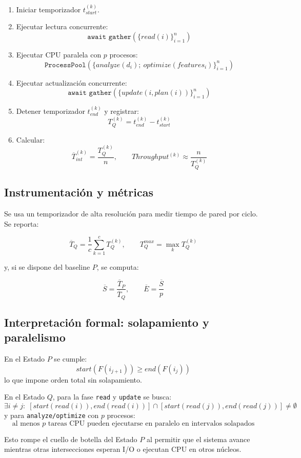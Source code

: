 \documentclass[12pt]{article}
\begin{document}
\begin{enumerate}
\item Iniciar temporizador \(t_{start}^{(k)}\).
\item Ejecutar lectura concurrente:
\[
\texttt{await gather}(\{read(i)\}_{i=1}^{n})
\]
\item Ejecutar CPU paralela con \(p\) procesos:
\[
\texttt{ProcessPool}(\{analyze(d_i);\ optimize(features_i)\}_{i=1}^{n})
\]
\item Ejecutar actualización concurrente:
\[
\texttt{await gather}(\{update(i,plan(i))\}_{i=1}^{n})
\]
\item Detener temporizador \(t_{end}^{(k)}\) y registrar:
\[
T_Q^{(k)} = t_{end}^{(k)} - t_{start}^{(k)}
\]
\item Calcular:
\[
\overline{T}_{int}^{(k)} = \frac{T_Q^{(k)}}{n},
\qquad
Throughput^{(k)} \approx \frac{n}{T_Q^{(k)}}
\]
\end{enumerate}

\subsection{Instrumentación y métricas}

Se usa un temporizador de alta resolución para medir tiempo de pared por ciclo. Se reporta:

\[
\overline{T}_Q = \frac{1}{c}\sum_{k=1}^{c} T_Q^{(k)},
\qquad
T_Q^{max} = \max_k T_Q^{(k)}
\]

y, si se dispone del baseline \(P\), se computa:

\[
\overline{S} = \frac{\overline{T}_P}{\overline{T}_Q},
\qquad
\overline{E} = \frac{\overline{S}}{p}
\]

\subsection{Interpretación formal: solapamiento y paralelismo}

En el Estado \(P\) se cumple:
\[
start(F(i_{j+1})) \ge end(F(i_j))
\]
lo que impone orden total sin solapamiento.

En el Estado \(Q\), para la fase \texttt{read} y \texttt{update} se busca:
\[
\exists i\neq j:\; [start(read(i)),end(read(i))]\cap[start(read(j)),end(read(j))]\neq \emptyset
\]
y para \texttt{analyze/optimize} con \(p\) procesos:
\[
\text{al menos }p\text{ tareas CPU pueden ejecutarse en paralelo en intervalos solapados}
\]

Esto rompe el cuello de botella del Estado \(P\) al permitir que el sistema avance mientras otras intersecciones
esperan I/O o ejecutan CPU en otros núcleos.
\end{document}
